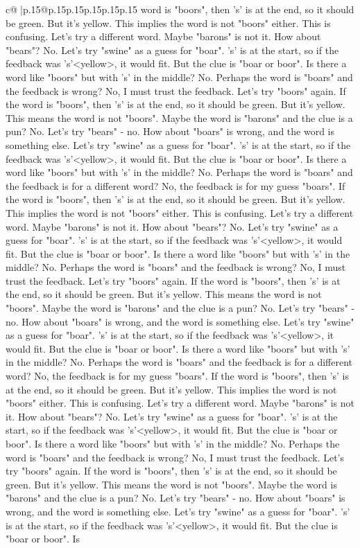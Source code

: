 \documentclass{article}
\begin{document}
{\begin{supertabular}{c@{$\;$}|p{.15\linewidth}@{}p{.15\linewidth}p{.15\linewidth}p{.15\linewidth}p{.15\linewidth}p{.15\linewidth}}
{{{word is "boors", then 's' is at the end, so it should be green. But it's yellow. This implies the word is not "boors" either. This is confusing. Let's try a different word. Maybe "barons" is not it. How about "bears"? No. Let's try "swine" as a guess for "boar". 's' is at the start, so if the feedback was 's'<yellow>, it would fit. But the clue is "boar or boor". Is there a word like "boors" but with 's' in the middle? No. Perhaps the word is "boars" and the feedback is wrong? No, I must trust the feedback. Let's try "boors" again. If the word is "boors", then 's' is at the end, so it should be green. But it's yellow. This means the word is not "boors". Maybe the word is "barons" and the clue is a pun? No. Let's try "bears" {-} no. How about "boars" is wrong, and the word is something else. Let's try "swine" as a guess for "boar". 's' is at the start, so if the feedback was 's'<yellow>, it would fit. But the clue is "boar or boor". Is there a word like "boors" but with 's' in the middle? No. Perhaps the word is "boars" and the feedback is for a different word? No, the feedback is for my guess "boars". If the word is "boors", then 's' is at the end, so it should be green. But it's yellow. This implies the word is not "boors" either. This is confusing. Let's try a different word. Maybe "barons" is not it. How about "bears"? No. Let's try "swine" as a guess for "boar". 's' is at the start, so if the feedback was 's'<yellow>, it would fit. But the clue is "boar or boor". Is there a word like "boors" but with 's' in the middle? No. Perhaps the word is "boars" and the feedback is wrong? No, I must trust the feedback. Let's try "boors" again. If the word is "boors", then 's' is at the end, so it should be green. But it's yellow. This means the word is not "boors". Maybe the word is "barons" and the clue is a pun? No. Let's try "bears" {-} no. How about "boars" is wrong, and the word is something else. Let's try "swine" as a guess for "boar". 's' is at the start, so if the feedback was 's'<yellow>, it would fit. But the clue is "boar or boor". Is there a word like "boors" but with 's' in the middle? No. Perhaps the word is "boars" and the feedback is for a different word? No, the feedback is for my guess "boars". If the word is "boors", then 's' is at the end, so it should be green. But it's yellow. This implies the word is not "boors" either. This is confusing. Let's try a different word. Maybe "barons" is not it. How about "bears"? No. Let's try "swine" as a guess for "boar". 's' is at the start, so if the feedback was 's'<yellow>, it would fit. But the clue is "boar or boor". Is there a word like "boors" but with 's' in the middle? No. Perhaps the word is "boars" and the feedback is wrong? No, I must trust the feedback. Let's try "boors" again. If the word is "boors", then 's' is at the end, so it should be green. But it's yellow. This means the word is not "boors". Maybe the word is "barons" and the clue is a pun? No. Let's try "bears" {-} no. How about "boars" is wrong, and the word is something else. Let's try "swine" as a guess for "boar". 's' is at the start, so if the feedback was 's'<yellow>, it would fit. But the clue is "boar or boor". Is }}}
\end{supertabular}}
\end{document}
